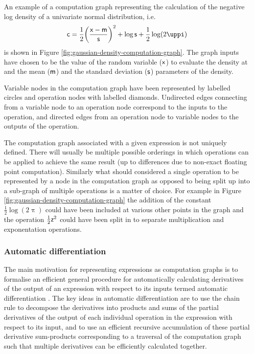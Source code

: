 An example of a computation graph representing the calculation of the negative log density of a univariate normal distribution, i.e.
\begin{equation}\label{eq:gaussian-nld-computation-graph-expression}
  \rvar{c} =
  \frac{1}{2}\lpa\frac{\rvar{x} - \rvar{m}}{\rvar{s}}\rpa^2 + \log\rvar{s} + \frac{1}{2}\log(2\uppi)
\end{equation}
is shown in Figure \ref{fig:gaussian-density-computation-graph}. The graph inputs have chosen to be the value of the random variable ($\mathsf{x}$) to evaluate the density at and the mean ($\mathsf{m}$) and the standard deviation ($\mathsf{s}$) parameters of the density. %

Variable nodes in the computation graph have been represented by labelled circles and operation nodes with labelled diamonds. Undirected edges connecting from a variable node to an operation node correspond to the inputs to the operation, and directed edges from an operation node to variable nodes to the outputs of the operation.

The computation graph associated with a given expression is not uniquely defined. There will usually be multiple possible orderings in which operations can be applied to achieve the same result (up to differences due to non-exact floating point computation). Similarly what should considered a single operation to be represented by a node in the computation graph as opposed to being split up into a sub-graph of multiple operations is a matter of choice. For example in Figure \ref{fig:gaussian-density-computation-graph} the addition of the constant $\frac{1}{2}\log(2\uppi)$ could have been included at various other points in the graph and the operation $\frac{1}{2}\mathsf{z}^2$ could have been split in to separate multiplication and exponentation operations.

\subsubsection{Automatic differentiation}

The main motivation for representing expressions as computation graphs is to formalise an efficient general procedure for automatically calculating derivatives of the output of an expression with respect to its inputs termed automatic differentiation \citep{nolan1953analytical,beda1959programs}. The key ideas in automatic differentiation are to use the chain rule to decompose the derivatives into products and sums of the partial derivatives of the output of each individual operation in the expression with respect to its input, and to use an efficient recursive accumulation of these partial derivative sum-products corresponding to a traversal of the computation graph such that multiple derivatives can be efficiently calculated together.

